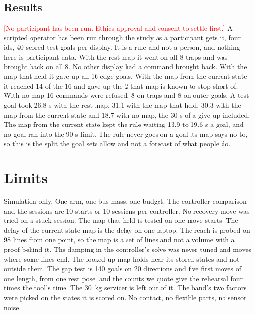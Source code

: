 \documentclass[pdflatex,sn-mathphys-num]{sn-jnl}
\newcommand{\todo}[1]{\textcolor{red}{[#1]}}
\begin{document}
\subsection{Results}
\todo{No participant has been run. Ethics approval and consent to settle first.} A scripted operator has been run
through the study as a participant gets it, four ids, 40 scored test goals per display. It is a rule and not a
person, and nothing here is participant data. With the rest map it went on all 8 traps and was brought back on
all 8. No other display had a command brought back. With the map that held it gave up all 16 edge goals. With
the map from the current state it reached 14 of the 16 and gave up the 2 that map is known to stop short of.
With no map 16 commands were refused, 8 on traps and 8 on outer goals. A test goal took 26.8 s with the rest
map, 31.1 with the map that held, 30.3 with the map from the current state and 18.7 with no map, the 30 s of a
give-up included. The map from the current state kept the rule waiting 13.9 to 19.6 s a goal, and no goal ran
into the 90 s limit. The rule never goes on a goal its map says no to, so this is the split the goal
sets allow and not a forecast of what people do. %

\section{Limits}
Simulation only. One arm, one bus mass, one budget. The controller comparison and the sessions are 10 starts
or 10 sessions per controller. No recovery move was tried on a stuck session. The map that held is tested on one-move starts. The delay of
the current-state map is the delay on one laptop. The reach is probed on 98 lines from one point, so the map is a
set of lines and not a volume with a proof behind it. The damping in the controller's solve was never tuned and
moves where some lines end. The looked-up map holds near its stored states and not outside them. The gap test is 140
goals on 20 directions and five first moves of one length, from one rest pose, and the counts we quote give the
rehearsal four times the tool's time. The 30~kg servicer is left out of it. The band's two factors were picked on
the states it is scored on. No contact, no flexible parts, no sensor noise.
\end{document}
